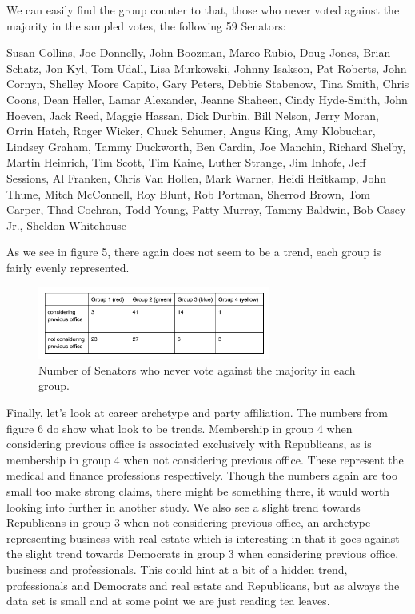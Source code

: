 \documentclass[11pt,twocolumn]{article}
\begin{document}
We can easily find the group counter to that, those who never voted against the majority in the sampled votes, the following 59 Senators:

Susan Collins, Joe Donnelly, John Boozman, Marco Rubio, Doug Jones, Brian Schatz, Jon Kyl, Tom Udall, Lisa Murkowski, Johnny Isakson, Pat Roberts, John Cornyn, Shelley Moore Capito, Gary Peters, Debbie Stabenow, Tina Smith, Chris Coons, Dean Heller, Lamar Alexander, Jeanne Shaheen, Cindy Hyde-Smith, John Hoeven, Jack Reed, Maggie Hassan, Dick Durbin, Bill Nelson, Jerry Moran, Orrin Hatch, Roger Wicker, Chuck Schumer, Angus King, Amy Klobuchar, Lindsey Graham, Tammy Duckworth, Ben Cardin, Joe Manchin, Richard Shelby, Martin Heinrich, Tim Scott, Tim Kaine, Luther Strange, Jim Inhofe, Jeff Sessions, Al Franken, Chris Van Hollen, Mark Warner, Heidi Heitkamp, John Thune, Mitch McConnell, Roy Blunt, Rob Portman, Sherrod Brown, Tom Carper, Thad Cochran, Todd Young, Patty Murray, Tammy Baldwin, Bob Casey Jr., Sheldon Whitehouse

As we see in figure 5, there again does not seem to be a trend, each group is fairly evenly represented.
\begin{figure}[H]
    \centering
    \includegraphics[width=3in]{major}
    \caption{Number of Senators who never vote against the majority in each group.}
    \label{fig:ds}
\end{figure}

Finally, let's look at career archetype and party affiliation. The numbers from figure 6 do show what look to be trends. Membership in group 4 when considering previous office is associated exclusively with Republicans, as is membership in group 4 when not considering previous office. These represent the medical and finance professions respectively. Though the numbers again are too small too make strong claims, there might be something there, it would worth looking into further in another study. We also see a slight trend towards Republicans in group 3 when not considering previous office, an archetype representing business with real estate which is interesting in that it goes against the slight trend towards Democrats in group 3 when considering previous office, business and professionals. This could hint at a bit of a hidden trend, professionals and Democrats and real estate and Republicans, but as always the data set is small and at some point we are just reading tea leaves.
\end{document}
